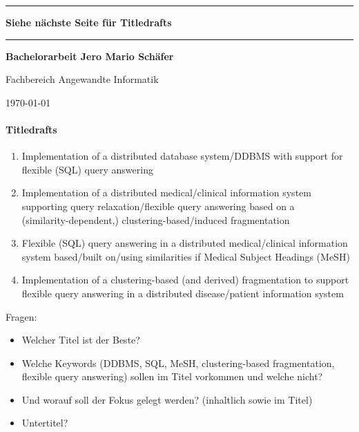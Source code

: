 
\newpage
\thispagestyle{empty}
\newcommand{\Rule}{\rule{\textwidth}{1mm}}

\begin{center}

\Rule\vspace{5mm}
\sffamily\bfseries\Huge
Siehe nächste Seite für Titledrafts
\vspace{1mm}\Rule
\vfill
\sffamily\bfseries\LARGE Bachelorarbeit
\vfill
\sffamily\bfseries\Large Jero Mario Schäfer\par
Fachbereich Angewandte Informatik\par
\vfill

\raisebox{7mm}{Georg-August-Universität}
\raisebox{7mm}{Göttingen}\par
\vfill
\today
\end{center}


\newpage
\paragraph{Titledrafts}
\begin{enumerate}
    \item Implementation of a distributed database system/DDBMS with support for flexible (SQL) query answering
    \item Implementation of a distributed medical/clinical information system supporting query relaxation/flexible
            query answering based on a \\(similarity-dependent,) clustering-based/induced fragmentation
    \item Flexible (SQL) query answering in a distributed medical/clinical information system based/built on/using 
            similarities if Medical Subject Headings (MeSH)
    \item Implementation of a clustering-based (and derived) fragmentation to support flexible query answering in a
            distributed disease/patient information system
\end{enumerate}

Fragen:
\begin{itemize}
    \item Welcher Titel ist der Beste?
    \item Welche Keywords (DDBMS, SQL, MeSH, clustering-based fragmentation, flexible query
            answering) sollen im Titel vorkommen und welche nicht?
    \item Und worauf soll der Fokus gelegt werden? (inhaltlich sowie im Titel)
    \item Untertitel?
\end{itemize}


